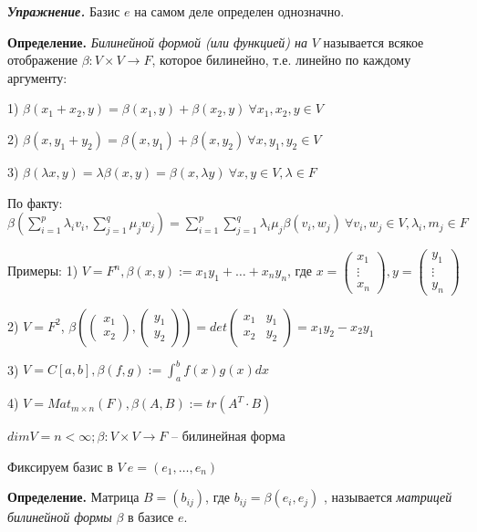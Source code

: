 \bigskip
\textbf{\textit{Упражнение.}} Базис $e$ на самом деле определен однозначно.

\bigskip
\textbf{Определение.} \textit{Билинейной формой (или функцией) на} $V$ называется всякое отображение $\beta: V \times V \rightarrow F$, которое билинейно, т.е. линейно по каждому аргументу:

1) $\beta(x_1 + x_2, y) = \beta(x_1, y) + \beta(x_2, y) \ \forall x_1, x_2, y \in V$

2) $\beta(x, y_1 + y_2) = \beta(x, y_1) + \beta(x, y_2) \ \forall x, y_1, y_2 \in V$

3) $\beta(\lambda x, y) = \lambda \beta(x, y) = \beta(x, \lambda y) \ \forall x, y \in V, \lambda \in F$

\bigskip
По факту: $\beta (\sum\limits_{i=1}^p \lambda_i v_i, \sum\limits_{j=1}^q \mu_j w_j) = \sum\limits_{i=1}^p \sum\limits_{j=1}^q \lambda_i \mu_j \beta(v_i, w_j) \ \forall v_i, w_j \in V, \lambda_i, m_j \in F$

\bigskip
Примеры: 1) $V = F^n, \beta(x, y):= x_1 y_1 + \dots + x_n y_n$, где $x = \begin{pmatrix} x_1 \\ \vdots \\ x_n \end{pmatrix}, y = \begin{pmatrix} y_1 \\ \vdots \\ y_n \end{pmatrix}$

2) $V = F^2$, $\beta \left(\begin{pmatrix} x_1 \\ x_2 \end{pmatrix}, \begin{pmatrix} y_1 \\ y_2 \end{pmatrix} \right) = det \begin{pmatrix} x_1 & y_1 \\ x_2 & y_2 \end{pmatrix} = x_1 y_2 - x_2 y_1$

3) $V = C[a, b], \beta(f, g):= \int_a^b f(x) g(x) dx$

4) $V = Mat_{m \times n} (F), \beta (A, B) := tr(A^T \cdot B)$

\bigskip
$dimV = n < \infty; \beta: V \times V \rightarrow F$ -- билинейная форма

Фиксируем базис в $V \ e = (e_1, \dots, e_n)$

\bigskip
\textbf{Определение.} Матрица $B = (b_{ij})$, где $b_{ij} = \beta(e_i, e_j)$ , называется \textit{матрицей билинейной формы} $\beta$ в базисе $e$.


